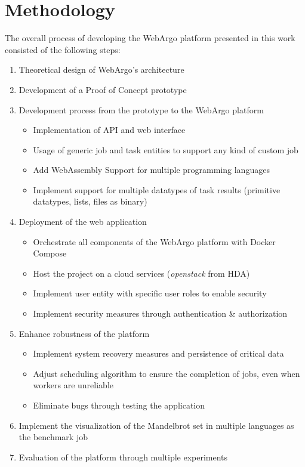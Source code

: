 \chapter{Methodology}
\label{ch:methodology}
The overall process of developing the WebArgo platform presented in this work consisted of the following steps:
\begin{enumerate}
  \item Theoretical design of WebArgo's architecture
  \item Development of a Proof of Concept prototype
  \item Development process from the prototype to the WebArgo platform
  \begin{itemize}
    \item Implementation of \ac{API} and web interface
    \item Usage of generic job and task entities to support any kind of custom job
    \item Add WebAssembly Support for multiple programming languages
    \item Implement support for multiple datatypes of task results (primitive datatypes, lists, files as binary)
  \end{itemize}
  \item Deployment of the web application
  \begin{itemize}
    \item Orchestrate all components of the WebArgo platform with Docker Compose \cite{conclusion:docker}
    \item Host the project on a cloud services (\emph{openstack} from \ac{HDA})
    \item Implement user entity with specific user roles to enable security
    \item Implement security measures through authentication \& authorization
  \end{itemize}
  \item Enhance robustness of the platform
  \begin{itemize}
    \item Implement system recovery measures and persistence of critical data
    \item Adjust scheduling algorithm to ensure the completion of jobs, even when workers are unreliable
    \item Eliminate bugs through testing the application
  \end{itemize}
  \item Implement the visualization of the Mandelbrot set in multiple languages as the benchmark job
  \item Evaluation of the platform through multiple experiments 
\end{enumerate}
